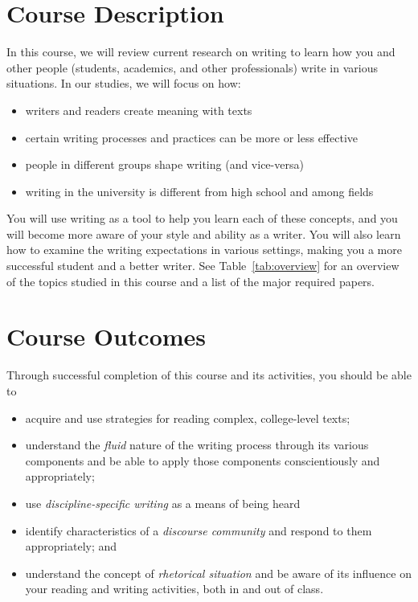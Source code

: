 \documentclass[11pt,oneside]{amsart}	%
\begin{document}
\section{Course Description} %
\label{sub:course_description}
In this course, we will review current research on writing to learn how you and other people (students, academics, and other professionals) write in various situations. In our studies, we will focus on how:
\begin{itemize}
	\item writers and readers create meaning with texts
	\item certain writing processes and practices can be more or less effective
	\item people in different groups shape writing (and vice-versa)
	\item writing in the university is different from high school and among fields
\end{itemize}
You will use writing as a tool to help you learn each of these concepts, and you will become more aware of your style and ability as a writer. You will also learn how to examine the writing expectations in various settings, making you a more successful student and a better writer. See Table~\ref{tab:overview} for an overview of the topics studied in this course and a list of the major required papers.



\section{Course Outcomes}\label{outcomes}
Through successful completion of this course and its activities, you should be able to
\begin{itemize}
	\item acquire and use strategies for reading complex, college-level texts;
	\item understand the \emph{fluid} nature of the writing process through its various components and be able to apply those components conscientiously and appropriately;
	\item use \emph{discipline-specific writing} as a means of being heard
	\item identify characteristics of a \emph{discourse community} and respond to them appropriately; and
	\item understand the concept of \emph{rhetorical situation} and be aware of its influence on your reading and writing activities, both in and out of class.
\end{itemize}
\end{document}
